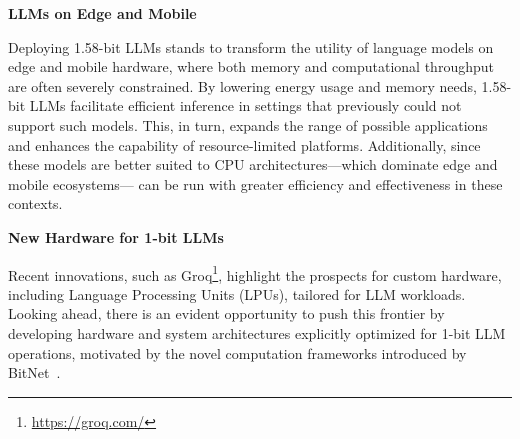 \textbf{LLMs on Edge and Mobile}

Deploying 1.58-bit LLMs stands to transform the utility of language models on edge and mobile hardware, where both memory and computational throughput are often severely constrained. By lowering energy usage and memory needs, 1.58-bit LLMs facilitate efficient inference in settings that previously could not support such models. This, in turn, expands the range of possible applications and enhances the capability of resource-limited platforms. Additionally, since these models are better suited to CPU architectures—which dominate edge and mobile ecosystems— can be run with greater efficiency and effectiveness in these contexts.

\textbf{New Hardware for 1-bit LLMs}

Recent innovations, such as Groq\footnote{\url{https://groq.com/}}, highlight the prospects for custom hardware, including Language Processing Units (LPUs), tailored for LLM workloads. Looking ahead, there is an evident opportunity to push this frontier by developing hardware and system architectures explicitly optimized for 1-bit LLM operations, motivated by the novel computation frameworks introduced by BitNet~\cite{bitnet}.